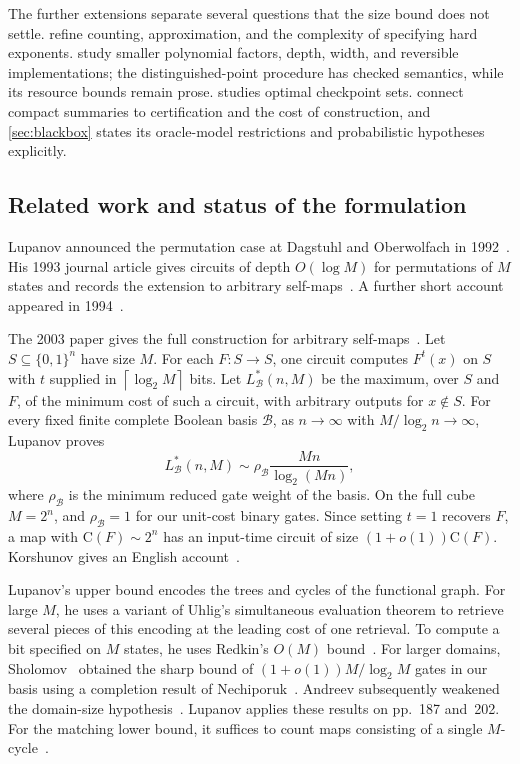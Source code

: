 \documentclass[11pt]{article}
\theoremstyle{definition}
\theoremstyle{remark}
\newcommand{\bits}{\{0,1\}}
\newcommand{\CC}{\mathrm{C}}
\newcommand{\ceil}[1]{\left\lceil #1\right\rceil}
\numberwithin{equation}{section}
\begin{document}
The further extensions separate several questions that the size bound
does not settle.  
refine counting, approximation, and the complexity of specifying hard
exponents.   study smaller
polynomial factors, depth, width, and reversible implementations;
the distinguished-point procedure has checked semantics, while its
resource bounds remain prose.   studies optimal
checkpoint sets.   connect
compact summaries to certification and the cost of construction, and
\cref{sec:blackbox} states its oracle-model restrictions and probabilistic
hypotheses explicitly.

\subsection{Related work and status of the formulation}\label{sec:related}

Lupanov announced the permutation case at Dagstuhl and Oberwolfach in
1992~\cite{Lupanov92D,Lupanov92O}.  His 1993 journal article gives circuits
of depth $O(\log M)$ for permutations of $M$ states and records the
extension to arbitrary self-maps~\cite[pp.~60, 66]{Lupanov93}.  A further short account
appeared in 1994~\cite{Lupanov94}.

The 2003 paper gives the full construction for arbitrary
self-maps~\cite[p.~180, eq.~(1)]{Lupanov03}.
Let $S\subseteq\bits^n$ have size $M$.  For each $F:S\to S$, one circuit
computes $F^t(x)$ on $S$ with $t$ supplied in $\ceil{\log_2 M}$ bits.
Let $L^*_{\mathcal B}(n,M)$ be the maximum, over $S$ and $F$, of the
minimum cost of such a circuit, with arbitrary outputs for $x\notin S$.
For every fixed finite complete Boolean basis $\mathcal B$, as
$n\to\infty$ with $M/\log_2 n\to\infty$, Lupanov proves
\[
  L^*_{\mathcal B}(n,M)\sim \rho_{\mathcal B}\frac{Mn}{\log_2(Mn)},
\]
where $\rho_{\mathcal B}$ is the minimum reduced gate weight of the
basis.  On the full cube $M=2^n$, and $\rho_{\mathcal B}=1$ for our
unit-cost binary gates.  Since setting $t=1$ recovers $F$, a map with
$\CC(F)\sim 2^n$ has an input-time circuit of size $(1+o(1))\CC(F)$.
Korshunov gives an English account~\cite[Theorem~2.3]{Korshunov12}.

Lupanov's upper bound encodes the trees and cycles of the functional
graph.  For large $M$, he uses a variant of Uhlig's simultaneous
evaluation theorem to retrieve several pieces of this encoding at the
leading cost of one retrieval.  To compute a bit specified on $M$ states,
he uses Redkin's $O(M)$ bound~\cite{Redkin69}.  For larger domains,
Sholomov~\cite{Sholomov69} obtained the sharp bound of $(1+o(1))M/\log_2 M$
gates in our basis using a completion result of Nechiporuk~\cite{Nechiporuk65}.
Andreev subsequently weakened the domain-size hypothesis~\cite[p.~44,
Theorem~1]{Andreev89}.  Lupanov applies these results on pp.~187 and~202.
For the matching lower bound, it suffices to count maps consisting of
a single $M$-cycle~\cite[p.~208]{Lupanov03}.
\end{document}
